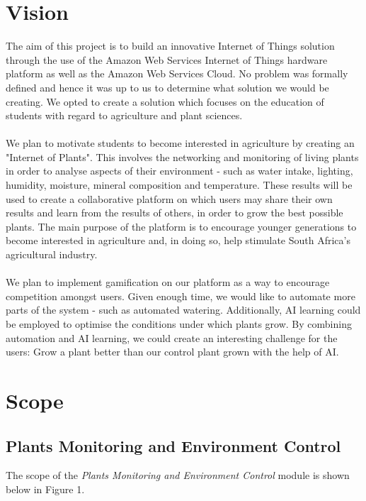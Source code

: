 \documentclass{article}
\begin{document}
\section{Vision}
The aim of this project is to build an innovative Internet of Things solution through the use of the Amazon Web Services Internet of Things hardware platform as well as the Amazon Web Services Cloud. No problem was formally defined and hence it was up to us to determine what solution we would be creating. We opted to create a solution which focuses on the education of students with regard to agriculture and plant sciences.\\\\
We plan to motivate students to become interested in agriculture by creating an "Internet of Plants". This involves the networking and monitoring of living plants in order to analyse aspects of their environment - such as water intake, lighting, humidity, moisture, mineral composition and temperature. These results will be used to create a collaborative platform on which users may share their own results and learn from the results of others, in order to grow the best possible plants. The main purpose of the platform is to encourage younger generations to become interested in agriculture and, in doing so, help stimulate South Africa's agricultural industry.\\\\
We plan to implement gamification on our platform as a way to encourage competition amongst users. Given enough time, we would like to automate more parts of the system - such as automated watering. Additionally, AI learning could be employed to optimise the conditions under which plants grow. By combining automation and AI learning, we could create an interesting challenge for the users: Grow a plant better than our control plant grown with the help of AI.

\section{Scope}
	\subsection{Plants Monitoring and Environment Control}
		The scope of the \emph{Plants Monitoring and Environment Control} module is shown below in Figure 1.
		
\end{document}
